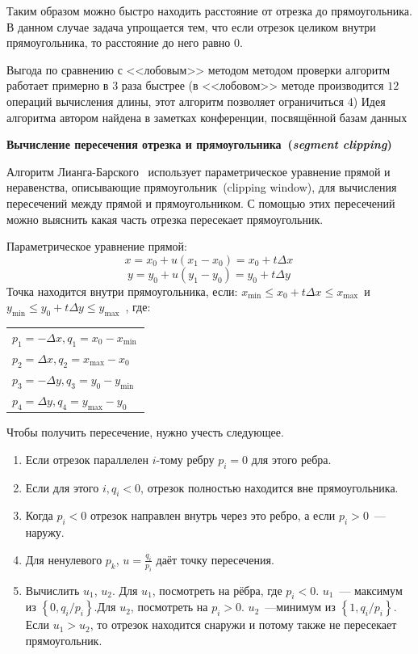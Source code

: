 Таким образом можно быстро находить расстояние от отрезка до прямоугольника. В данном случае задача упрощается тем, что если отрезок целиком внутри прямоугольника, то расстояние до него равно $0$. 

Выгода по сравнению с <<лобовым>> методом методом проверки алгоритм работает примерно в 3 раза быстрее (в <<лобовом>> методе производится $12$ операций вычисления длины, этот алгоритм позволяет ограничиться $4$)
Идея алгоритма автором найдена в заметках конференции, посвящённой базам данных \cite{seginters}


\textbf{Вычисление пересечения отрезка и прямоугольника~(\emph{segment clipping})}

Алгоритм Лианга-Барского~\cite{barsky} использует параметрическое уравнение прямой и неравенства, описывающие прямоугольник~(clipping window), для вычисления пересечений между прямой и прямоугольником. С помощью этих пересечений можно выяснить какая часть отрезка пересекает прямоугольник.

Параметрическое уравнение прямой:
$$x = x_0 + u (x_1 - x_0) = x_0 + t \Delta x\,\!$$
$$y = y_0 + u (y_1 - y_0) = y_0 + t \Delta y\,\!$$
Точка находится внутри прямоугольника, если:
$x_{\text{min}} \leqslant x_0 + t \Delta x \leqslant x_{\text{max}}\,\!$
и
$y_{\text{min}} \leqslant y_0 + t \Delta y \leqslant y_{\text{max}}\,\!$
, где:

\begin{tabular}{l}
$p_1 = -\Delta x  , q_1 = x_0 - x_{\text{min}}\,\!$ \\
$p_2 = \Delta x  ,  q_2 = x_{\text{max}} - x_0\,\!$\\
$p_3 = -\Delta y , q_3 = y_0 - y_\text{min}\,\!$\\
$p_4 = \Delta y ,  q_4 = y_\text{max} - y_0\,\! $
\end{tabular}

Чтобы получить пересечение, нужно учесть следующее.
\begin{enumerate}
\item Если отрезок параллелен $i$-тому ребру $p_i=0$  для этого ребра.
\item Если для этого $i,q_i<0$, отрезок полностью находится вне прямоугольника.
\item Когда $p_i<0$ отрезок направлен внутрь через это ребро, а если $p_i>0$~---наружу.
\item Для ненулевого $p_k$, $u=\frac{q_i}{p_i}$ даёт точку пересечения.
\item Вычислить $u_1$, $u_2$. Для $u_1$, посмотреть на рёбра, где  $p_i<0$. $u_1$~--- максимум из $\left\{0,{q_i}/{p_i}\right\}$.Для $u_2$, посмотреть на $p_i>0$. $u_2$~---минимум из $\left\{1,{q_i}/{p_i}\right\}$. Если $u_1>u_2$, то отрезок находится снаружи и потому также не пересекает прямоугольник.
\end{enumerate}

